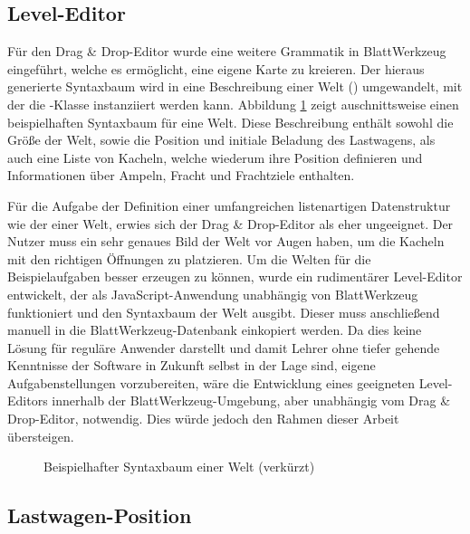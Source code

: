 \subsection{Level-Editor}
\label{sec:implementation:program:level-editor}

Für den Drag \& Drop-Editor wurde eine weitere Grammatik in BlattWerkzeug eingeführt, welche es ermöglicht, eine eigene Karte zu kreieren. Der hieraus generierte Syntaxbaum wird in eine Beschreibung einer Welt () umgewandelt, mit der die -Klasse instanziiert werden kann. Abbildung \ref{fig:implementation:program:level-editor:tree} zeigt auschnittsweise einen beispielhaften Syntaxbaum für eine Welt. Diese Beschreibung enthält sowohl die Größe der Welt, sowie die Position und initiale Beladung des Lastwagens, als auch eine Liste von Kacheln, welche wiederum ihre Position definieren und Informationen über Ampeln, Fracht und Frachtziele enthalten.

Für die Aufgabe der Definition einer umfangreichen listenartigen Datenstruktur wie der einer Welt, erwies sich der Drag \& Drop-Editor als eher ungeeignet. Der Nutzer muss ein sehr genaues Bild der Welt vor Augen haben, um die Kacheln mit den richtigen Öffnungen zu platzieren. Um die Welten für die Beispielaufgaben besser erzeugen zu können, wurde ein rudimentärer Level-Editor entwickelt, der als JavaScript-Anwendung unabhängig von BlattWerkzeug funktioniert und den Syntaxbaum der Welt ausgibt. Dieser muss anschließend manuell in die BlattWerkzeug-Datenbank einkopiert werden. Da dies keine Lösung für reguläre Anwender darstellt und damit Lehrer ohne tiefer gehende Kenntnisse der Software in Zukunft selbst in der Lage sind, eigene Aufgabenstellungen vorzubereiten, wäre die Entwicklung eines geeigneten Level-Editors innerhalb der BlattWerkzeug-Umgebung, aber unabhängig vom Drag \& Drop-Editor, notwendig. Dies würde jedoch den Rahmen dieser Arbeit übersteigen.

\begin{figure}
  
  \caption{Beispielhafter Syntaxbaum einer Welt (verkürzt)}
  \label{fig:implementation:program:level-editor:tree}
\end{figure}

\subsection{Lastwagen-Position}
\label{sec:implementation:rendering:truck-position}


